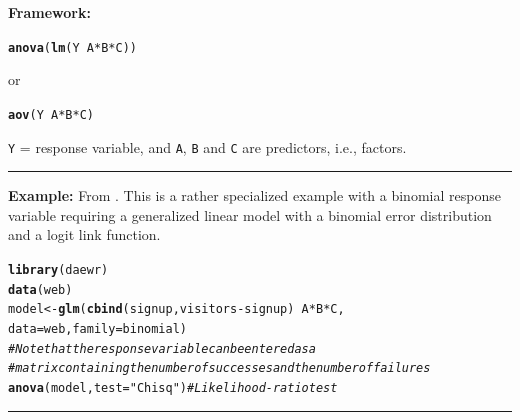 \documentclass[12pt,english]{article}\usepackage[]{graphicx}\usepackage[table]{xcolor}
\makeatletter
\newcommand{\hlsng}[1]{\textcolor[rgb]{0.192,0.494,0.8}{#1}}%
\newcommand{\hlcom}[1]{\textcolor[rgb]{0.678,0.584,0.686}{\textit{#1}}}%
\newcommand{\hlopt}[1]{\textcolor[rgb]{0,0,0}{#1}}%
\newcommand{\hldef}[1]{\textcolor[rgb]{0.345,0.345,0.345}{#1}}%
\newcommand{\hlkwb}[1]{\textcolor[rgb]{0.69,0.353,0.396}{#1}}%
\newcommand{\hlkwc}[1]{\textcolor[rgb]{0.333,0.667,0.333}{#1}}%
\newcommand{\hlkwd}[1]{\textcolor[rgb]{0.737,0.353,0.396}{\textbf{#1}}}%
\newenvironment{kframe}{%
 \def\at@end@of@kframe{}%
 \ifinner\ifhmode%
  \def\at@end@of@kframe{\end{minipage}}%
  \begin{minipage}{\columnwidth}%
 \fi\fi%
 \def\FrameCommand##1{\hskip\@totalleftmargin \hskip-\fboxsep
 \colorbox{shadecolor}{##1}\hskip-\fboxsep
     \hskip-\linewidth \hskip-\@totalleftmargin \hskip\columnwidth}%
 \MakeFramed {\advance\hsize-\width
   \@totalleftmargin\z@ \linewidth\hsize
   \@setminipage}}%
 {\par\unskip\endMakeFramed%
 \at@end@of@kframe}
\newenvironment{knitrout}{}{} %
\makeatother
\begin{document}
\begin{tcolorbox}[colback=yellow!50!red!25!white,colbacktitle=yellow!50!red,colframe=black!75!white,title=\textbf{R:} Three Fixed Factors]
\textbf{Framework:}\\
\vspace{-.2in}
\begin{knitrout}
\color{fgcolor}\begin{kframe}
\begin{alltt}
\hlkwd{anova}\hldef{(}\hlkwd{lm}\hldef{(Y} \hlopt{~} \hldef{A} \hlopt{*} \hldef{B} \hlopt{*} \hldef{C))}
\end{alltt}
\end{kframe}
\end{knitrout}
\vspace{-.1in}
or
\vspace{-.1in}
\begin{knitrout}
\color{fgcolor}\begin{kframe}
\begin{alltt}
\hlkwd{aov}\hldef{(Y} \hlopt{~} \hldef{A} \hlopt{*} \hldef{B} \hlopt{*} \hldef{C)}
\end{alltt}
\end{kframe}
\end{knitrout}
\texttt{Y} = response variable, and \texttt{A}, \texttt{B} and \texttt{C} are predictors, i.e., factors.
\vspace{0.1in}
\par\noindent\rule{.9\textwidth}{0.4pt}

\textbf{Example:} From \citep[][pg 83]{lawson}. This is a rather specialized example with a binomial response variable requiring a generalized linear model with a binomial error distribution and a logit link function.
\vspace{-.1in}
\begin{knitrout}
\color{fgcolor}\begin{kframe}
\begin{alltt}
\hlkwd{library}\hldef{(daewr)}
\hlkwd{data}\hldef{(web)}
\hldef{model} \hlkwb{<-} \hlkwd{glm}\hldef{(}\hlkwd{cbind}\hldef{(signup, visitors} \hlopt{-} \hldef{signup)} \hlopt{~} \hldef{A} \hlopt{*} \hldef{B} \hlopt{*} \hldef{C,}
             \hlkwc{data} \hldef{= web,} \hlkwc{family} \hldef{= binomial)}
\hlcom{# Note that the response variable can be entered as a}
\hlcom{# matrix containing the number of successes and the number of failures}
\hlkwd{anova}\hldef{(model,} \hlkwc{test} \hldef{=} \hlsng{"Chisq"}\hldef{)} \hlcom{# Likelihood-ratio test}
\end{alltt}
\end{kframe}
\end{knitrout}

\end{tcolorbox}
\par\noindent\rule{.9\textwidth}{0.4pt}
\newpage
\end{document}
